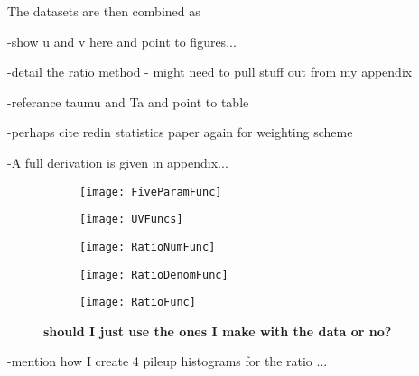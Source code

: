 The datasets are then combined as 


-show u and v here and point to figures...





-detail the ratio method - might need to pull stuff out from my appendix 

-referance taumu and Ta and point to table 

-perhaps cite redin statistics paper again for weighting scheme


-A full derivation is given in appendix...


    \begin{figure}[]
    \centering
        \begin{subfigure}[t]{0.45\textwidth}
            \centering
            \texttt{[image: FiveParamFunc]}
            \caption{}
        \label{fig:fiveparamfunc}
        \end{subfigure}%

        \vspace{2mm}
        \begin{subfigure}[t]{0.45\textwidth}
            \centering
            \texttt{[image: UVFuncs]}
            \caption{}
        \label{fig:UVfuncs}
        \end{subfigure}
        \begin{subfigure}[t]{0.45\textwidth}
            \centering
            \texttt{[image: RatioNumFunc]}
            \caption{}
        \label{fig:rationumfunc}
        \end{subfigure}%
        \vspace{2mm}
        \begin{subfigure}[t]{0.45\textwidth}
            \centering
            \texttt{[image: RatioDenomFunc]}
            \caption{}
        \label{fig:ratiodenomfunc}
        \end{subfigure}
        \begin{subfigure}[t]{0.45\textwidth}
            \centering
            \texttt{[image: RatioFunc]}
            \caption{}
        \label{fig:ratiofunc}
        \end{subfigure}%
    \caption[]{\textbf{should I just use the ones I make with the data or no?}}
    \label{}
    \end{figure}



-mention how I create 4 pileup histograms for the ratio ...






